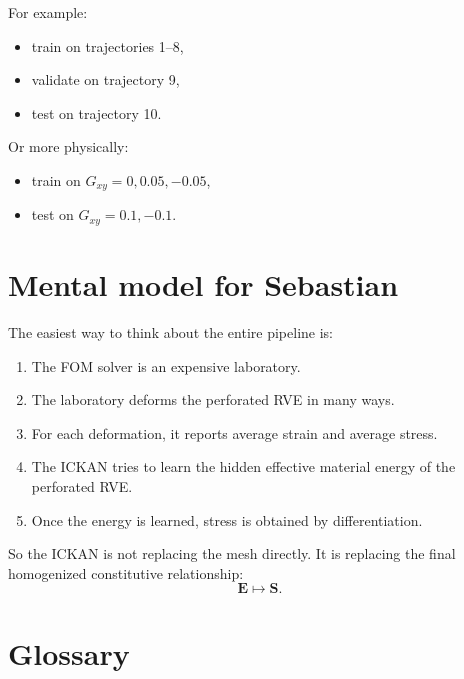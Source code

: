 \documentclass[11pt]{article}
\newcommand{\E}{\bm{E}}
\newcommand{\Sstress}{\bm{S}}
\begin{document}
For example:

\begin{itemize}[leftmargin=2em]
  \item train on trajectories 1--8,
  \item validate on trajectory 9,
  \item test on trajectory 10.
\end{itemize}

Or more physically:

\begin{itemize}[leftmargin=2em]
  \item train on $G_{xy}=0,0.05,-0.05$,
  \item test on $G_{xy}=0.1,-0.1$.
\end{itemize}

\section{Mental model for Sebastian}

The easiest way to think about the entire pipeline is:

\begin{enumerate}[leftmargin=2em]
  \item The FOM solver is an expensive laboratory.
  \item The laboratory deforms the perforated RVE in many ways.
  \item For each deformation, it reports average strain and average stress.
  \item The ICKAN tries to learn the hidden effective material energy of the
        perforated RVE.
  \item Once the energy is learned, stress is obtained by differentiation.
\end{enumerate}

So the ICKAN is not replacing the mesh directly. It is replacing the final
homogenized constitutive relationship:
\[
  \E \mapsto \Sstress.
\]

\section{Glossary}
\end{document}
